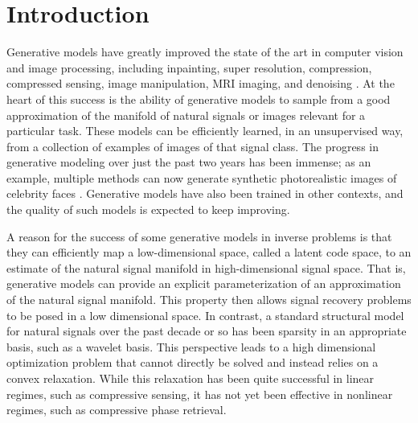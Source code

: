 \section{Introduction}

Generative models have greatly improved the state of the art in computer vision and image processing, including inpainting, super resolution, compression, compressed sensing, image manipulation, MRI imaging, and denoising \cite{GAN,oord2016pixel,mao2016image,yeh2017semantic,sonderby2016amortised,ledig2016photo,johnson2016perceptual,mousavi2015deep,mousavi2017learning,zhu2016generative,rippel2017real,mardani2017deep,mardani2017recurrent,mousavi2015deep,mousavi2017learning}.
At the heart of this success is the ability of generative models to sample from a good approximation of the manifold of natural signals or images relevant for a particular task.  These models can be efficiently learned, in an unsupervised way, from a collection of examples of images of that signal class.  The progress in generative modeling over just the past two years has been immense; as an example, multiple methods can now generate synthetic photorealistic images of celebrity faces \cite{karras2017progressive,kingma2018glow}.  Generative models have also been trained in other contexts, and the quality of such models is expected to keep improving.

A reason for the success of some generative models in inverse problems is that they can efficiently map a low-dimensional space, called a latent code space, to an estimate of the natural signal manifold in high-dimensional signal space.  That is, generative models can provide an explicit parameterization of an approximation of the natural signal manifold.  This property then allows signal recovery problems to be posed in a low dimensional space.  In contrast, a standard structural model for natural signals over the past decade or so has been sparsity in an appropriate basis, such as a wavelet basis.  This perspective leads to a high dimensional optimization problem that cannot directly be solved and instead relies on a convex relaxation.  While this relaxation has been quite successful in linear regimes, such as compressive sensing, it has not yet been effective in nonlinear regimes, such as compressive phase retrieval.

